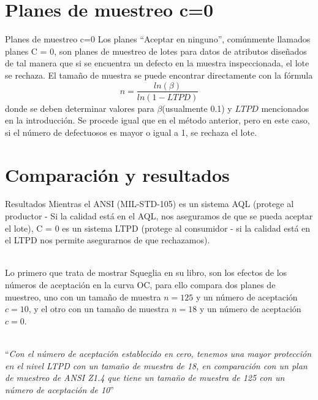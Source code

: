 \documentclass[10pt]{beamer}
\begin{document}
\section{Planes de muestreo c=0}
\begin{frame}{Planes de muestreo c=0}
Los planes ``Aceptar en ninguno'', comúnmente llamados planes C = 0, son planes de muestreo de lotes para datos de atributos diseñados de tal manera que si se encuentra un defecto en la muestra inspeccionada, el lote se rechaza. El tamaño de muestra se puede encontrar directamente con la fórmula
$$n=\frac{ln(\beta)}{ln(1-LTPD)}$$ 
donde se deben determinar valores para $\beta$(usualmente 0.1) y $LTPD$ mencionados en la introducción. Se procede igual que en el método anterior, pero en este caso, si el número de defectuosos es mayor o igual a 1, se rechaza el lote.
\end{frame}


\section{Comparación y resultados}
\begin{frame}{Resultados}
Mientras el ANSI (MIL-STD-105) es un sistema AQL (protege al productor - Si la calidad está en el AQL, nos aseguramos de que se pueda aceptar el lote), C = 0 es un sistema LTPD (protege al consumidor - si la calidad está en el LTPD nos permite asegurarnos de que rechazamos).

~\\Lo primero que trata de mostrar Squeglia en su libro, son los efectos de los números de aceptación en la curva OC, para ello compara dos planes de muestreo, uno con un tamaño de muestra $n=125$ y un número de aceptación $c=10$, y el otro con un tamaño de muestra $n=18$ y un número de aceptación $c=0$.

~\\``\textit{Con el número de aceptación establecido en cero, tenemos una mayor protección en el nivel LTPD con un tamaño de muestra de 18, en comparación con un plan de muestreo de ANSI Z1.4 que tiene un tamaño de muestra de 125 con un número de aceptación de 10}''
\end{frame}
\end{document}
